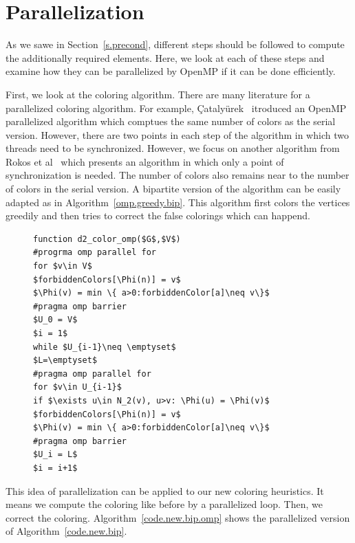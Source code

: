 \documentclass[12pt, twoside]{book}
\newcommand{\secref}[1]{Section~\protect\ref{#1}}
\newcommand{\coderef}[1]{Algorithm~\protect\ref{#1}}
\begin{document}
\section{Parallelization}
\label{s.parallel}
As we sawe in \secref{s.precond}, different steps should be followed
to compute the additionally required elements. Here, we look at each of
these steps and examine how they can be parallelized by OpenMP
if it can be done efficiently.

First, we look at the coloring algorithm.
There are many literature for a parallelized coloring algorithm.
For example,
{\c{C}}ataly{\"{u}}rek~\cite{cataly2012} itroduced an OpenMP parallelized
algorithm which comptues the same number of colors as the serial version.
However, there are two points in each step of the algorithm in which two threads
need to be synchronized.
However, we focus on another algorithm from Rokos et al~\cite{Rokos2015}
which presents an algorithm in which only a point of synchronization is
needed. The number of colors also remains near to the number of colors
in the serial version. A bipartite version of the algorithm can be easily
adapted as in \coderef{omp.greedy.bip}. This algorithm first colors the vertices
greedily and then tries to correct the false colorings which can happend.
\begin{figure}
\begin{lstlisting}[caption=A OpenMP parallelized version of greedy algorithm
adapted for the bipartite graph.,label=omp.greedy.bip,mathescape]
function d2_color_omp($G$,$V$)
#progrma omp parallel for
for $v\in V$
$forbiddenColors[\Phi(n)] = v$
$\Phi(v) = min \{ a>0:forbiddenColor[a]\neq v\}$
#pragma omp barrier
$U_0 = V$
$i = 1$
while $U_{i-1}\neq \emptyset$
$L=\emptyset$
#pragma omp parallel for
for $v\in U_{i-1}$
if $\exists u\in N_2(v), u>v: \Phi(u) = \Phi(v)$
$forbiddenColors[\Phi(n)] = v$
$\Phi(v) = min \{ a>0:forbiddenColor[a]\neq v\}$
#pragma omp barrier
$U_i = L$
$i = i+1$
\end{lstlisting}
\end{figure}
This idea of parallelization can be applied to our new coloring heuristics.
It means we compute the coloring like before by a parallelized loop.
Then, we correct the coloring. \coderef{code.new.bip.omp} shows the parallelized
version of \coderef{code.new.bip}.
\end{document}
